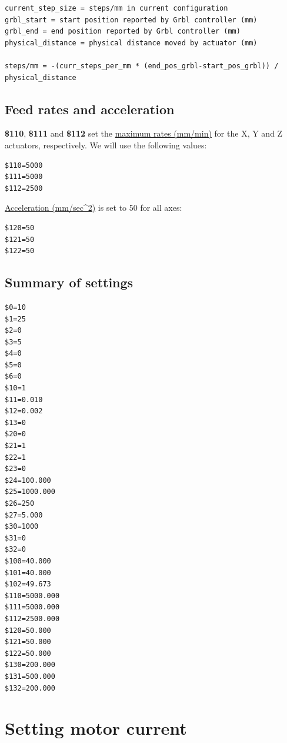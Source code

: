 \documentclass[
]{book}
\begin{document}
\begin{verbatim}
current_step_size = steps/mm in current configuration
grbl_start = start position reported by Grbl controller (mm)
grbl_end = end position reported by Grbl controller (mm)
physical_distance = physical distance moved by actuator (mm)

steps/mm = -(curr_steps_per_mm * (end_pos_grbl-start_pos_grbl)) / physical_distance
\end{verbatim}

\hypertarget{feed-rates-and-acceleration}{%
\subsection{Feed rates and acceleration}\label{feed-rates-and-acceleration}}

\textbf{\$110}, \textbf{\$111} and \textbf{\$112} set the \href{https://github.com/gnea/grbl/wiki/Grbl-v1.1-Configuration\#110-111-and-112--xyz-max-rate-mmmin}{maximum rates (mm/min)} for the X, Y and Z actuators, respectively. We will use the following values:

\begin{verbatim}
$110=5000
$111=5000
$112=2500
\end{verbatim}

\href{https://github.com/gnea/grbl/wiki/Grbl-v1.1-Configuration\#120-121-122--xyz-acceleration-mmsec2}{Acceleration (mm/sec\^{}2)} is set to 50 for all axes:

\begin{verbatim}
$120=50
$121=50
$122=50
\end{verbatim}

\hypertarget{summary-of-settings}{%
\subsection{Summary of settings}\label{summary-of-settings}}

\begin{verbatim}
$0=10
$1=25
$2=0
$3=5
$4=0
$5=0
$6=0
$10=1
$11=0.010
$12=0.002
$13=0
$20=0
$21=1
$22=1
$23=0
$24=100.000
$25=1000.000
$26=250
$27=5.000
$30=1000
$31=0
$32=0
$100=40.000
$101=40.000
$102=49.673
$110=5000.000
$111=5000.000
$112=2500.000
$120=50.000
$121=50.000
$122=50.000
$130=200.000
$131=500.000
$132=200.000
\end{verbatim}

\hypertarget{setting-motor-current}{%
\section{Setting motor current}\label{setting-motor-current}}
\end{document}
